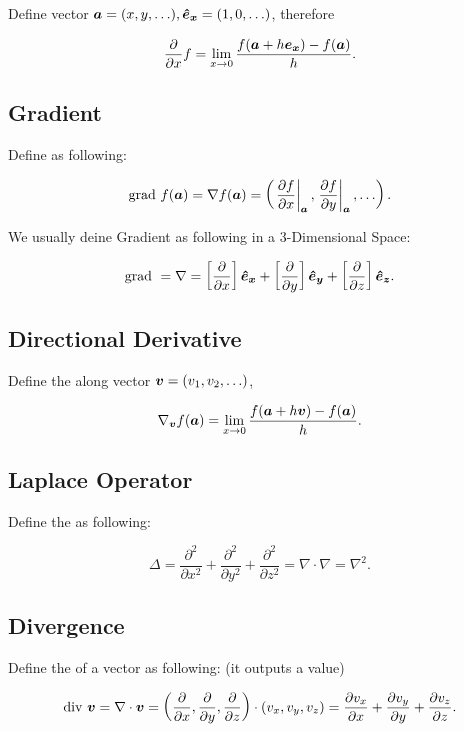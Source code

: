 \documentclass{article}
\begin{document}
			Define vector \(\boldsymbol{a} = (x, y, \ldots), \boldsymbol{\hat{e}_x} = (1, 0, \ldots)\), therefore

			\[
				\frac{\partial}{\partial x} f = \lim_{x\rightarrow 0} \frac{f(\boldsymbol{a} + h \boldsymbol{e_x}) - f(\boldsymbol{a})}{h}.
			\]

		\subsection{Gradient}

			Define  as following:

			\[
				\mathrm{grad}\  f(\boldsymbol{a}) = \nabla f(\boldsymbol{a}) = \left(\left. \frac{\partial f}{\partial x} \right\vert _{ \boldsymbol{a} }, \left. \frac{\partial f}{\partial y} \right\vert _{ \boldsymbol{a} }, \ldots\right).
			\]

			We usually deine Gradient as following in a 3-Dimensional Space:

			\[
				\mathrm{grad}\  = \nabla = \left[\frac{\partial}{\partial x}\right]\boldsymbol{\hat{e}_x} + \left[\frac{\partial}{\partial y}\right]\boldsymbol{\hat{e}_y} + \left[\frac{\partial}{\partial z}\right]\boldsymbol{\hat{e}_z}.
			\]

		\subsection{Directional Derivative}

			Define the  along vector \(\boldsymbol{v} = \left(v_1, v_2, \ldots\right)\),

			\[
				\nabla_{\boldsymbol{v}} f(\boldsymbol{a}) = \lim_{x \rightarrow 0} \frac{f(\boldsymbol{a} + h \boldsymbol{v}) - f(\boldsymbol{a})}{h}.
			\]

		\subsection{Laplace Operator}

			Define the  as following:

			\[
				\Delta = \frac{\partial^2}{\partial x^2} + \frac{\partial^2}{\partial y^2} + \frac{\partial^2}{\partial z^2} = \nabla \cdot \nabla = \nabla^2.
			\]

		\subsection{Divergence}

			Define the  of a vector as following: (it outputs a value)

			\[
				\mathrm{div}\  \boldsymbol{v} = \nabla \cdot \boldsymbol{v} = \left(\frac{\partial}{\partial x}, \frac{\partial}{\partial y}, \frac{\partial}{\partial z} \right) \cdot \left(v_x, v_y, v_z\right) = \frac{\partial v_x}{\partial x} + \frac{\partial v_y}{\partial y} + \frac{\partial v_z}{\partial z}.
			\]
\end{document}
